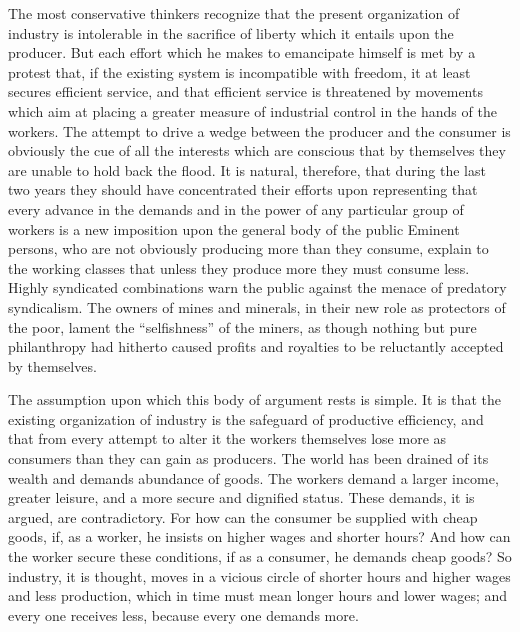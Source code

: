 \documentclass{book}
\begin{document}
The most conservative thinkers recognize that the present organization of industry is intolerable in the sacrifice of liberty which it entails upon the producer. But each effort which he makes to emancipate himself is met by a protest that, if the existing system is incompatible with freedom, it at least secures efficient service, and that efficient service is threatened by movements which aim at placing a greater measure of industrial control in the hands of the workers. The attempt to drive a wedge between the producer and the consumer is obviously the cue of all the interests which are conscious that by themselves they are unable to hold back the flood. It is natural, therefore, that during the last two years they should have concentrated their efforts upon representing that every advance in the demands and in the power of any particular group of workers is a new imposition upon the general body of the public Eminent persons, who are not obviously producing more than they consume, explain to the working classes that unless they produce more they must consume less. Highly syndicated combinations warn the public against the menace of predatory syndicalism. The owners of mines and minerals, in their new role as protectors of the poor, lament the “selfishness” of the miners, as though nothing but pure philanthropy had hitherto caused profits and royalties to be reluctantly accepted by themselves.

The assumption upon which this body of argument rests is simple. It is that the existing organization of industry is the safeguard of productive efficiency, and that from every attempt to alter it the workers themselves lose more as consumers than they can gain as producers. The world has been drained of its wealth and demands abundance of goods. The workers demand a larger income, greater leisure, and a more secure and dignified status. These demands, it is argued, are contradictory. For how can the consumer be supplied with cheap goods, if, as a worker, he insists on higher wages and shorter hours? And how can the worker secure these conditions, if as a consumer, he demands cheap goods? So industry, it is thought, moves in a vicious circle of shorter hours and higher wages and less production, which in time must mean longer hours and lower wages; and every one receives less, because every one demands more.
\end{document}
